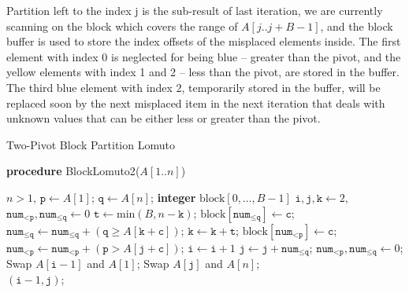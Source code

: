 \documentclass[a4paper,oneside,12pt]{book}
\newcommand\lomutotwo{\textsf{BlockLomuto2}}
\begin{document}
Partition left to the index j is the sub-result of last iteration, we are currently scanning on the block which covers the range of $A[j..j+B-1]$, and the block buffer is used to store the index offsets of the misplaced elements inside.
The first element with index 0 is neglected for being blue -- greater than the pivot, and the yellow elements with index 1 and 2 -- less than the pivot, are stored in the buffer. The third blue element with index 2, temporarily stored in the buffer, will be replaced soon by the next misplaced item in the next iteration that deals with unknown values that can be either less or greater than the pivot.

\begin{algorithm}[t!]
    \small
    \caption{Two-Pivot Block Partition Lomuto}\samepage\label{algo:dual:pivot:partitioning}
    \textbf{procedure} \lomutotwo($\textit{A}[1..\textit{n}]$)
    \begin{algorithmic}[1]
        \Require $n > 1$, 
        \State $\texttt{p} \gets \textit{A}[1]$; $\texttt{q} \gets \textit{A}[n]$; 
    \State \textbf{integer} $\text{block}[0, \ldots, \textit{B} - 1]$
    \State  $\texttt{i}, \texttt{j}, \texttt{k} \gets 2$, $\texttt{num}_{< \texttt{p}}, \texttt{num}_{\leq \texttt{q}} \gets 0$
    \State $\texttt{t} \gets \text{min}(\textit{B}, \textit{n} - \texttt{k} )$;
            \State $\text{block}[\texttt{num}_{\leq \texttt{q}}] \gets \texttt{c}$;
        \State $\texttt{num}_{\leq \texttt{q}} \gets \texttt{num}_{\leq \texttt{q}} +  (\texttt{q} \geq \textit{A}[\texttt{k} + \texttt{c}])$;
            \EndFor
        \State {}
            \EndFor
            \State $\texttt{k} \gets \texttt{k} + \texttt{t}$;
        \State $\text{block}[\texttt{num}_{< \texttt{p}}] \gets \texttt{c}$;
    \State $\texttt{num}_{< \texttt{p}} \gets \texttt{num}_{< \texttt{p}} +  (\texttt{p} > \textit{A}[\texttt{j} + \texttt{c}])$;
            \EndFor
        \State {}
        \State $\texttt{i} \gets \texttt{i} + 1$
            \EndFor
            \State $\texttt{j} \gets \texttt{j} + \texttt{num}_{\leq \texttt{q}}$;
    \State $\texttt{num}_{< \texttt{p}}, \texttt{num}_{\leq \texttt{q}} \gets 0$;
        \EndWhile
        \State Swap $\textit{A}[\texttt{i} - 1]$ and $\textit{A}[1]$;
    \State Swap $\textit{A}[\texttt{j}]$ and $\textit{A}[\textit{n}]$;\\
\Return $(\texttt{i} - 1,\texttt{j})$;
    \end{algorithmic}
\end{algorithm}
\end{document}
